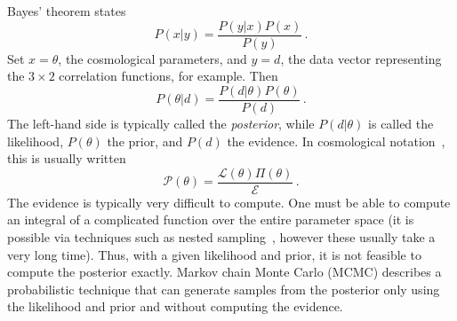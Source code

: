 Bayes' theorem states
\begin{equation}
	P(x|y) = \frac{P(y|x) P(x)}{P(y)}\,.
\end{equation}
Set $x=\theta$, the cosmological parameters, and $y=d$, the data vector representing the $3\times 2$ correlation functions, for example. Then
\begin{equation}
	P(\theta|d) = \frac{P(d|\theta) P(\theta)}{P(d)}\,.
\end{equation}
The left-hand side is typically called the \textit{posterior}, while $P(d|\theta)$ is called the likelihood, $P(\theta)$ the prior, and $P(d)$ the evidence. In cosmological notation~\cite{raveri_non-gaussian_2021}, this is usually written
\begin{equation}
	\mathcal{P}(\theta) = \frac{\mathcal{L}(\theta) \Pi(\theta)}{\mathcal{E}}\,.
\end{equation}
The evidence is typically very difficult to compute. One must be able to compute an integral of a complicated function over the entire parameter space (it is possible via techniques such as nested sampling~\cite{handley_polychord_2015}, however these usually take a very long time). Thus, with a given likelihood and prior, it is not feasible to compute the posterior exactly. Markov chain Monte Carlo (MCMC) describes a probabilistic technique that can generate samples from the posterior only using the likelihood and prior and without computing the evidence.
